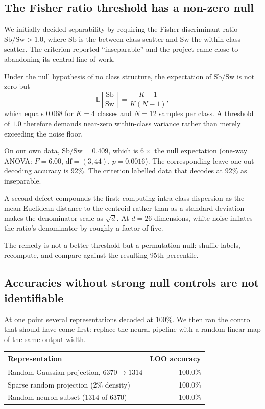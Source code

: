 \documentclass[11pt]{article}
\begin{document}
\subsection{The Fisher ratio threshold has a non-zero null}

We initially decided separability by requiring the Fisher discriminant ratio
$\mathrm{Sb}/\mathrm{Sw} > 1.0$, where $\mathrm{Sb}$ is the between-class
scatter and $\mathrm{Sw}$ the within-class scatter. The criterion reported
``inseparable'' and the project came close to abandoning its central line of
work.

Under the null hypothesis of no class structure, the expectation of
$\mathrm{Sb}/\mathrm{Sw}$ is not zero but
\begin{equation}
  \mathbb{E}\left[\frac{\mathrm{Sb}}{\mathrm{Sw}}\right]
  = \frac{K-1}{K(N-1)},
\end{equation}
which equals $0.068$ for $K=4$ classes and $N=12$ samples per class. A threshold
of $1.0$ therefore demands near-zero within-class variance rather than
merely exceeding the noise floor.

On our own data, $\mathrm{Sb}/\mathrm{Sw} = 0.409$, which is $6\times$ the null
expectation (one-way ANOVA: $F = 6.00$, $\mathrm{df} = (3,44)$, $p = 0.0016$).
The corresponding leave-one-out decoding accuracy is 92\%. The criterion labelled
data that decodes at 92\% as inseparable.

A second defect compounds the first: computing intra-class dispersion as the mean
Euclidean distance to the centroid rather than as a standard deviation makes the
denominator scale as $\sqrt{d}$. At $d = 26$ dimensions, white noise inflates the
ratio's denominator by roughly a factor of five.

The remedy is not a better threshold but a permutation null: shuffle labels,
recompute, and compare against the resulting 95th percentile.

\subsection{Accuracies without strong null controls are not identifiable}

At one point several representations decoded at 100\%. We then ran the control
that should have come first: replace the neural pipeline with a random linear map
of the same output width.

\begin{center}
\begin{tabular}{@{}lr@{}}
\toprule
Representation & LOO accuracy \\
\midrule
Random Gaussian projection, $6370 \to 1314$ & 100.0\% \\
Sparse random projection (2\% density)      & 100.0\% \\
Random neuron subset (1314 of 6370)         & 100.0\% \\
\bottomrule
\end{tabular}
\end{center}
\end{document}

